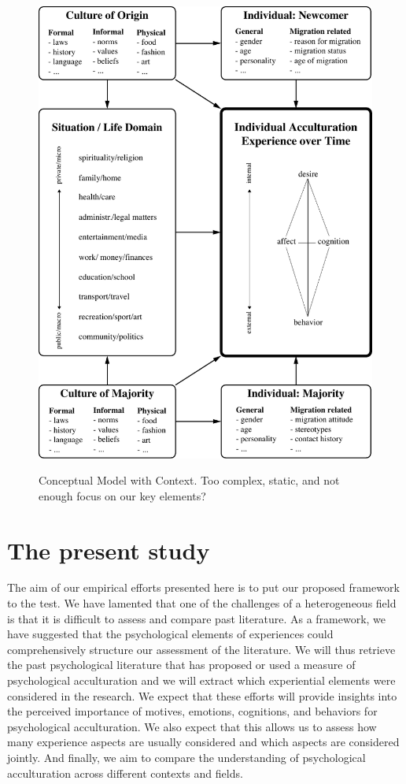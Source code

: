 \documentclass[nobib]{tufte-handout}
\begin{document}
\begin{figure}[h]
\centering
\caption{Conceptual Model with Context. Too complex, static, and not enough focus on our key elements?}
\includegraphics[width=\textwidth]{Figures/ConceptualFrameworkStatic.pdf}
\label{fig:ModelContext}
\end{figure}

\section{The present study}
The aim of our empirical efforts presented here is to put our proposed framework to the test. We have lamented that one of the challenges of a heterogeneous field is that it is difficult to assess and compare past literature. As a framework, we have suggested that the psychological elements of experiences could comprehensively structure our assessment of the literature. We will thus retrieve the past psychological literature that has proposed or used a measure of psychological acculturation and we will extract which experiential elements were considered in the research. We expect that these efforts will provide insights into the perceived importance of motives, emotions, cognitions, and behaviors for psychological acculturation. We also expect that this allows us to assess how many experience aspects are usually considered and which aspects are considered jointly. And finally, we aim to compare the understanding of psychological acculturation across different contexts and fields. 
\end{document}
